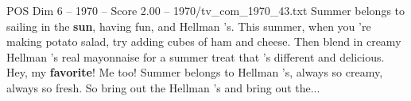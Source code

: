 \begin{textsample}{POS Dim 6 – 1970 – Score 2.00 – 1970/tv\_com\_1970\_43.txt}  \label{ex:f6_pos_033}
Summer belongs to sailing in the \textbf{sun}, having fun, and Hellman 's.
This summer, when you 're making potato salad, try adding cubes of ham and cheese.
Then blend in creamy Hellman 's real mayonnaise for a summer treat that 's different and delicious.
Hey, my \textbf{favorite}!
Me too!
Summer belongs to Hellman 's, always so creamy, always so fresh.
So bring out the Hellman 's and bring out the...

\end{textsample}
